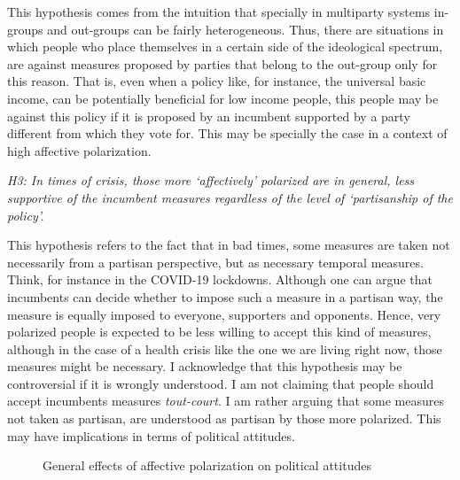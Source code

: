 \documentclass[a4paper, svgnames]{article}
\begin{document}
This hypothesis comes from the intuition that specially in multiparty systems in-groups and out-groups can be fairly heterogeneous. Thus, there are situations in which people who place themselves in a certain side of the ideological spectrum, are against measures proposed by parties that belong to the out-group only for this reason. That is, even when a policy like, for instance, the universal basic income, can be potentially beneficial for low income people, this people may be against this policy if it is proposed by an incumbent supported by a party different from which they vote for. This may be specially the case in a context of high affective polarization.

\textit{H3: In times of crisis, those more `affectively' polarized are in general, less supportive of the incumbent measures regardless of the level of `partisanship of the policy'.}

This hypothesis refers to the fact that in bad times, some measures are taken not necessarily from a partisan perspective, but as necessary temporal measures. Think, for instance in the COVID-19 lockdowns. Although one can argue that incumbents can decide whether to impose such a measure in a partisan way, the measure is equally imposed to everyone, supporters and opponents. Hence, very polarized people is expected to be less willing to accept this kind of measures, although in the case of a health crisis like the one we are living right now, those measures might be necessary. I acknowledge that this hypothesis may be controversial if it is wrongly understood. I am not claiming that people should accept incumbents measures \textit{tout-court}. I am rather arguing that some measures not taken as partisan, are understood as partisan by those more polarized. This may have implications in terms of political attitudes.

\begin{figure}[H]
	\centering
	\caption{\label{fig:general-model} General effects of affective polarization on political attitudes}
\end{figure}
\end{document}
